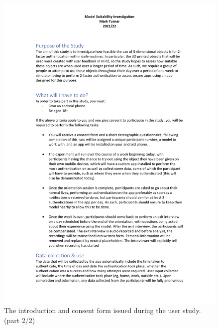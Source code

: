 \documentclass{l4proj}
\begin{document}
\begin{appendices}
\begin{figure}
    \includegraphics[page=2,width=\linewidth]{Appendices/introduction_script_and_consent_form.pdf}
    \caption{The introduction and consent form issued during the user study. (part 2/2)}
    \label{fig:intro2}
\end{figure}


\end{appendices}
\end{document}

